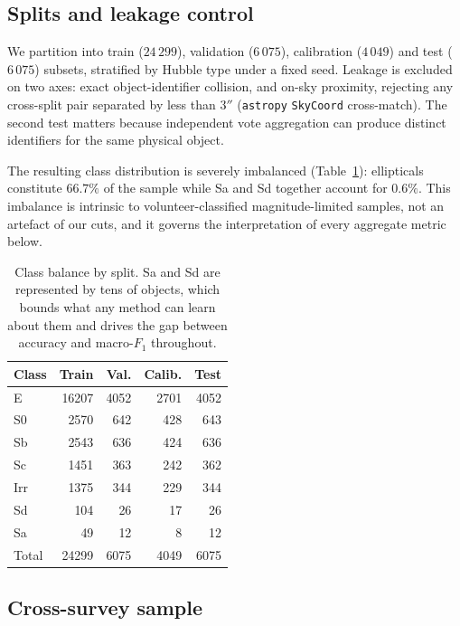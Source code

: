 \documentclass[11pt]{article}
\newcommand{\code}[1]{\texttt{\small #1}}
\begin{document}
\subsection{Splits and leakage control}

We partition into train ($24\,299$), validation ($6\,075$), calibration
($4\,049$) and test ($6\,075$) subsets, stratified by Hubble type under a fixed
seed. Leakage is excluded on two axes: exact object-identifier collision, and
on-sky proximity, rejecting any cross-split pair separated by less than
$3''$ (\code{astropy} \code{SkyCoord} cross-match). The second test matters
because independent vote aggregation can produce distinct identifiers for the
same physical object.

The resulting class distribution is severely imbalanced
(Table~\ref{tab:balance}): ellipticals constitute $66.7\%$ of the sample while
Sa and Sd together account for $0.6\%$. This imbalance is intrinsic to
volunteer-classified magnitude-limited samples, not an artefact of our cuts,
and it governs the interpretation of every aggregate metric below.

\begin{table}[htbp]
\centering
\caption{Class balance by split. Sa and Sd are represented by tens of objects,
which bounds what any method can learn about them and drives the gap between
accuracy and macro-$F_1$ throughout.}
\label{tab:balance}
\begin{tabular}{lrrrr}
\toprule
Class & Train & Val. & Calib. & Test \\
\midrule
E   & 16207 & 4052 & 2701 & 4052 \\
S0  &  2570 &  642 &  428 &  643 \\
Sb  &  2543 &  636 &  424 &  636 \\
Sc  &  1451 &  363 &  242 &  362 \\
Irr &  1375 &  344 &  229 &  344 \\
Sd  &   104 &   26 &   17 &   26 \\
Sa  &    49 &   12 &    8 &   12 \\
\midrule
Total & 24299 & 6075 & 4049 & 6075 \\
\bottomrule
\end{tabular}
\end{table}

\subsection{Cross-survey sample}
\end{document}
